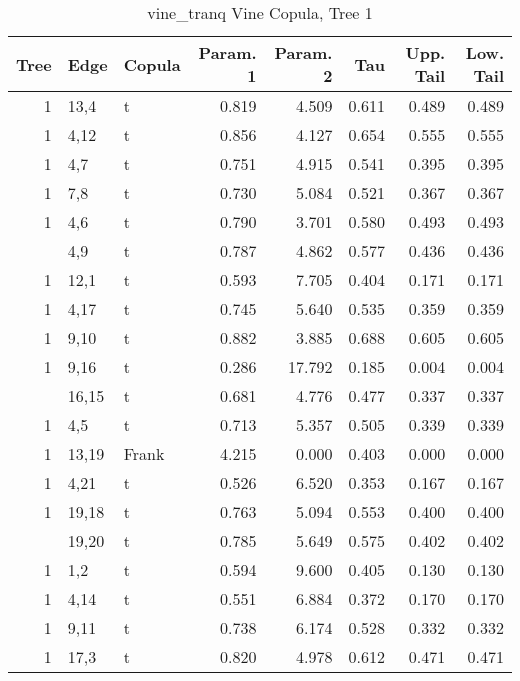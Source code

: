 \begin{table}

\caption{vine_tranq Vine Copula, Tree 1}
\centering
\begin{tabular}[t]{rllrrrrr}
\toprule
Tree & Edge & Copula & Param. 1 & Param. 2 & Tau & Upp. Tail & Low. Tail\\
\midrule
1 & 13,4 & t & 0.819 & 4.509 & 0.611 & 0.489 & 0.489\\
1 & 4,12 & t & 0.856 & 4.127 & 0.654 & 0.555 & 0.555\\
1 & 4,7 & t & 0.751 & 4.915 & 0.541 & 0.395 & 0.395\\
1 & 7,8 & t & 0.730 & 5.084 & 0.521 & 0.367 & 0.367\\
1 & 4,6 & t & 0.790 & 3.701 & 0.580 & 0.493 & 0.493\\
\addlinespace
1 & 4,9 & t & 0.787 & 4.862 & 0.577 & 0.436 & 0.436\\
1 & 12,1 & t & 0.593 & 7.705 & 0.404 & 0.171 & 0.171\\
1 & 4,17 & t & 0.745 & 5.640 & 0.535 & 0.359 & 0.359\\
1 & 9,10 & t & 0.882 & 3.885 & 0.688 & 0.605 & 0.605\\
1 & 9,16 & t & 0.286 & 17.792 & 0.185 & 0.004 & 0.004\\
\addlinespace
1 & 16,15 & t & 0.681 & 4.776 & 0.477 & 0.337 & 0.337\\
1 & 4,5 & t & 0.713 & 5.357 & 0.505 & 0.339 & 0.339\\
1 & 13,19 & Frank & 4.215 & 0.000 & 0.403 & 0.000 & 0.000\\
1 & 4,21 & t & 0.526 & 6.520 & 0.353 & 0.167 & 0.167\\
1 & 19,18 & t & 0.763 & 5.094 & 0.553 & 0.400 & 0.400\\
\addlinespace
1 & 19,20 & t & 0.785 & 5.649 & 0.575 & 0.402 & 0.402\\
1 & 1,2 & t & 0.594 & 9.600 & 0.405 & 0.130 & 0.130\\
1 & 4,14 & t & 0.551 & 6.884 & 0.372 & 0.170 & 0.170\\
1 & 9,11 & t & 0.738 & 6.174 & 0.528 & 0.332 & 0.332\\
1 & 17,3 & t & 0.820 & 4.978 & 0.612 & 0.471 & 0.471\\
\bottomrule
\end{tabular}
\end{table}
